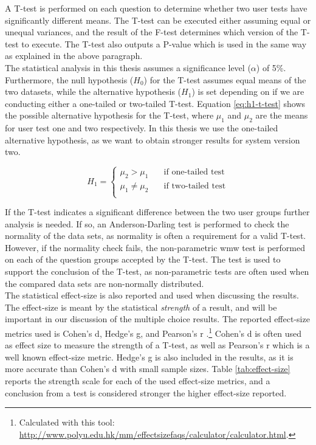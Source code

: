 A T-test \cite{walpole1993} is performed on each question to determine whether two user tests have significantly different means. The T-test can be executed either assuming equal or unequal variances, and the result of the F-test determines which version of the T-test to execute. The T-test also outputs a P-value which is used in the same way as explained in the above paragraph. \\

The statistical analysis in this thesis assumes a significance level ($\alpha$) of 5\%. Furthermore, the null hypothesis ($H_0$) for the T-test assumes equal means of the two datasets, while the alternative hypothesis ($H_1$) is set depending on if we are conducting either a one-tailed or two-tailed T-test. Equation \ref{eq:h1-t-test} shows the possible alternative hypothesis for the T-test, where $\mu_{1}$ and $\mu_{2}$ are the means for user test one and two respectively. In this thesis we use the one-tailed alternative hypothesis, as we want to obtain stronger results for system version two.

\begin{equation} \label{eq:h1-t-test}
   H_1 =
    \begin{cases}
        \mu_{2} > \mu_{1} & \quad \text{if one-tailed test}\\
        \mu_{1} \neq \mu_{2} & \quad \text{if two-tailed test}\\
    \end{cases}
\end{equation}

If the T-test indicates a significant difference between the two user groups further analysis is needed. If so, an Anderson-Darling test \cite{razali2011} is performed to check the normality of the data sets, as normality is often a requirement for a valid T-test. However, if the normality check fails, the non-parametric \gls{wmw} test \cite{hodges2005} is performed on each of the question groups accepted by the T-test. The test is used to support the conclusion of the T-test, as non-parametric tests are often used when the compared data sets are non-normally distributed. \\

The statistical effect-size is also reported and used when discussing the results. The effect-size is meant by the statistical \textit{strength} of a result, and will be important in our discussion of the multiple choice results. The reported effect-size metrics used is Cohen's d, Hedge's g, and Pearson's r \cite{cumming2013}.\footnote{Calculated with this tool: \url{http://www.polyu.edu.hk/mm/effectsizefaqs/calculator/calculator.html}.} Cohen's d is often used as effect size to measure the strength of a T-test, as well as Pearson's r which is a well known effect-size metric. Hedge's g is also included in the results, as it is more accurate than Cohen's d with small sample sizes. Table \ref{tab:effect-size} reports the strength scale for each of the used effect-size metrics, and a conclusion from a test is considered stronger the higher effect-size reported. \\

